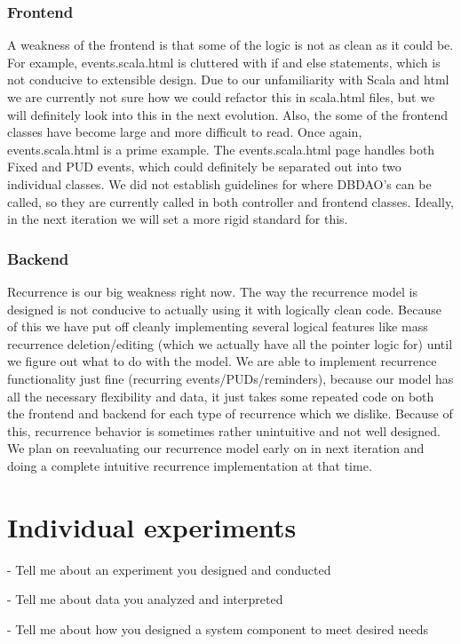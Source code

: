 \documentclass{article}
\begin{document}
\subsubsection{Frontend}
A weakness of the frontend is that some of the logic is not as clean as it could be. For example, events.scala.html is cluttered with if and else statements, which is not conducive to extensible design. Due to our unfamiliarity with Scala and html we are currently not sure how we could refactor this in scala.html files, but we will definitely look into this in the next evolution. Also, the some of the frontend classes have become large and more difficult to read. Once again, events.scala.html is a prime example. The events.scala.html page handles both Fixed and PUD events, which could definitely be separated out into two individual classes. We did not establish guidelines for where DBDAO’s can be called, so they are currently called in both controller and frontend classes. Ideally, in the next iteration we will set a more rigid standard for this.
\subsubsection{Backend}
Recurrence is our big weakness right now. The way the recurrence model is designed is not conducive to actually using it with logically clean code. Because of this we have put off cleanly implementing several logical features like mass recurrence deletion/editing (which we actually have all the pointer logic for) until we figure out what to do with the model. We are able to implement recurrence functionality just fine (recurring events/PUDs/reminders), because our model has all the necessary flexibility and data, it just takes some repeated code on both the frontend and backend for each type of recurrence which we dislike. Because of this, recurrence behavior is sometimes rather unintuitive and not well designed. We plan on reevaluating our recurrence model early on in next iteration and doing a complete intuitive recurrence implementation at that time.

\section{Individual experiments}

- Tell me about an experiment you designed and conducted

- Tell me about data you analyzed and interpreted 

- Tell me about how you designed a system component to meet desired needs
\end{document}
